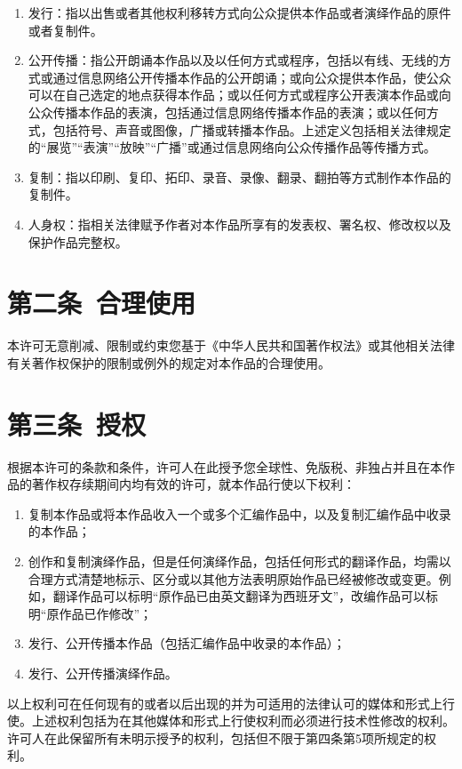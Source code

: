\begin{enumerate}
	\item 发行：指以出售或者其他权利移转方式向公众提供本作品或者演绎作品的原件或者复制件。
	\item 公开传播：指公开朗诵本作品以及以任何方式或程序，包括以有线、无线的方式或通过信息网络公开传播本作品的公开朗诵；或向公众提供本作品，使公众可以在自己选定的地点获得本作品；或以任何方式或程序公开表演本作品或向公众传播本作品的表演，包括通过信息网络传播本作品的表演；或以任何方式，包括符号、声音或图像，广播或转播本作品。上述定义包括相关法律规定的“展览”“表演”“放映”“广播”或通过信息网络向公众传播作品等传播方式。
	\item 复制：指以印刷、复印、拓印、录音、录像、翻录、翻拍等方式制作本作品的复制件。
	\item 人身权：指相关法律赋予作者对本作品所享有的发表权、署名权、修改权以及保护作品完整权。
\end{enumerate}
\section{第二条\ 合理使用}
本许可无意削减、限制或约束您基于《中华人民共和国著作权法》或其他相关法律有关著作权保护的限制或例外的规定对本作品的合理使用。
\section{第三条\ 授权}
根据本许可的条款和条件，许可人在此授予您全球性、免版税、非独占并且在本作品的著作权存续期间内均有效的许可，就本作品行使以下权利：
\begin{enumerate}
	\item 复制本作品或将本作品收入一个或多个汇编作品中，以及复制汇编作品中收录的本作品；
	\item 创作和复制演绎作品，但是任何演绎作品，包括任何形式的翻译作品，均需以合理方式清楚地标示、区分或以其他方法表明原始作品已经被修改或变更。例如，翻译作品可以标明“原作品已由英文翻译为西班牙文”，改编作品可以标明“原作品已作修改”；
	\item 发行、公开传播本作品（包括汇编作品中收录的本作品）； 
	\item 发行、公开传播演绎作品。
\end{enumerate}
以上权利可在任何现有的或者以后出现的并为可适用的法律认可的媒体和形式上行使。上述权利包括为在其他媒体和形式上行使权利而必须进行技术性修改的权利。许可人在此保留所有未明示授予的权利，包括但不限于第四条第5项所规定的权利。
